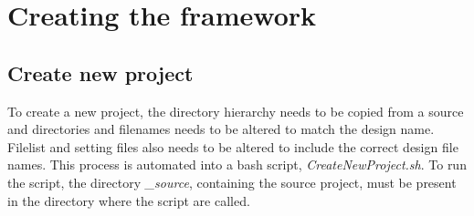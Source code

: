 \chapter{Creating the framework}
\section{Create new project}
To create a new project, the directory hierarchy needs to be copied from a source and directories and filenames needs to be altered to match the design name. Filelist and setting files also needs to be altered to include the correct design file names. This process is automated into a bash script, \textit{CreateNewProject.sh}. To run the script, the directory \textit{\_source}, containing the source project, must be present in the directory where the script are called.

